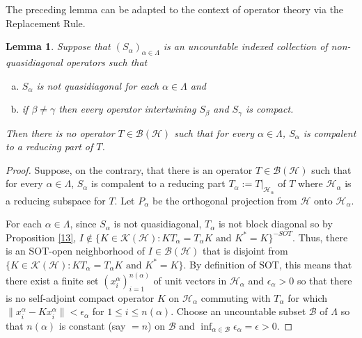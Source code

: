 \documentclass[11pt]{amsart}
\newtheorem{lemma}[theorem]{Lemma}
\theoremstyle{definition}
\numberwithin{equation}{section}
\begin{document}
The preceding lemma can be adapted to the context of operator theory via the Replacement Rule.
\begin{lemma}\label{25}
Suppose that $(S_{\alpha})_{\alpha\in\Lambda}$ is an uncountable indexed collection of non-quasidiagonal operators such that
\begin{enumerate}[(a)]
\item $S_{\alpha}$ is not quasidiagonal for each $\alpha\in\Lambda$ and
\item if $\beta\neq\gamma$ then every operator intertwining $S_{\beta}$ and $S_{\gamma}$ is compact.
\end{enumerate}
Then there is no operator $T\in\mathcal{B(H)}$ such that for every $\alpha\in\Lambda$, $S_{\alpha}$ is compalent to a reducing part of $T$.
\end{lemma}
\begin{proof}
Suppose, on the contrary, that there is an operator $T\in\mathcal{B(H)}$ such that for every $\alpha\in\Lambda$, $S_{\alpha}$ is compalent to a reducing part $T_{\alpha}:=
T|_{\mathcal{H}_{\alpha}}$ of $T$ where $\mathcal{H}_{\alpha}$ is a reducing subspace for $T$. Let $P_{\alpha}$ be the orthogonal projection from $\mathcal{H}$ onto
$\mathcal{H}_{\alpha}$.

For each $\alpha\in\Lambda$, since $S_{\alpha}$ is not quasidiagonal, $T_{\alpha}$ is not block diagonal so by Proposition \ref{13}, $I\notin\{K\in\mathcal{K(H)}:KT_{
\alpha}=T_{\alpha}K\text{ and }K^{*}=K\}^{-SOT}$. Thus, there is an SOT-open neighborhood of $I\in\mathcal{B(H)}$ that is disjoint from $\{K\in\mathcal{K(H)}:KT_{\alpha}=
T_{\alpha}K\text{ and }K^{*}=K\}$. By definition of SOT, this means that there exist a finite set $(x_{i}^{\alpha})_{i=1}^{n(\alpha)}$ of unit vectors in $\mathcal{H}_{
\alpha}$ and $\epsilon_{\alpha}>0$ so that there is no self-adjoint compact operator $K$ on $\mathcal{H}_{\alpha}$ commuting with $T_{\alpha}$ for which
$\|x_{i}^{\alpha}-Kx_{i}^{\alpha}\|<\epsilon_{\alpha}$ for $1\leq i\leq n(\alpha)$. Choose an uncountable subset $\mathscr{B}$ of $\Lambda$ so that $n(\alpha)$ is constant
(say $=n$) on $\mathscr{B}$ and $\displaystyle\inf_{\alpha\in \mathscr{B}}\epsilon_{\alpha}=\epsilon>0$.


\end{proof}
\end{document}
